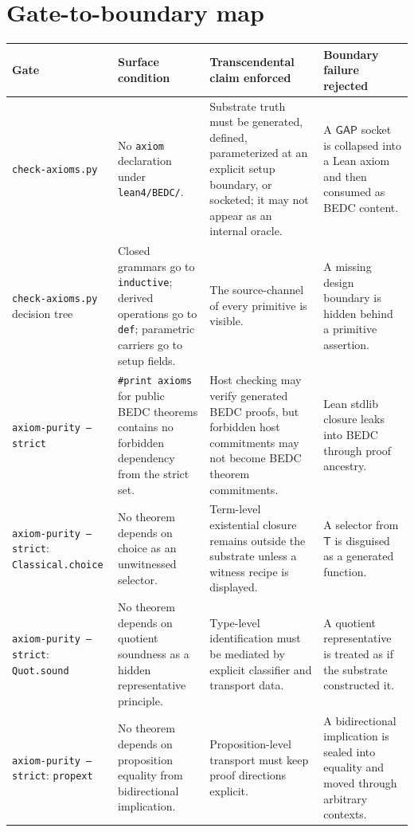 \section{Gate-to-boundary map}
\label{sec:audit-gates-long-map}

\begin{longtable}{p{}p{}p{}p{}}
\toprule
\textbf{Gate} & \textbf{Surface condition} & \textbf{Transcendental claim enforced} & \textbf{Boundary failure rejected} \\
\midrule
\texttt{check-axioms.py} & No \texttt{axiom} declaration under \texttt{lean4/BEDC/}. & Substrate truth must be generated, defined, parameterized at an explicit setup boundary, or socketed; it may not appear as an internal oracle. & A $\mathsf{GAP}$ socket is collapsed into a Lean axiom and then consumed as BEDC content. \\
\texttt{check-axioms.py} decision tree & Closed grammars go to \texttt{inductive}; derived operations go to \texttt{def}; parametric carriers go to setup fields. & The source-channel of every primitive is visible. & A missing design boundary is hidden behind a primitive assertion. \\
\texttt{axiom-purity --strict} & \texttt{\#print axioms} for public BEDC theorems contains no forbidden dependency from the strict set. & Host checking may verify generated BEDC proofs, but forbidden host commitments may not become BEDC theorem commitments. & Lean stdlib closure leaks into BEDC through proof ancestry. \\
\texttt{axiom-purity --strict}: \texttt{Classical.choice} & No theorem depends on choice as an unwitnessed selector. & Term-level existential closure remains outside the substrate unless a witness recipe is displayed. & A selector from $\mathsf{T}$ is disguised as a generated function. \\
\texttt{axiom-purity --strict}: \texttt{Quot.sound} & No theorem depends on quotient soundness as a hidden representative principle. & Type-level identification must be mediated by explicit classifier and transport data. & A quotient representative is treated as if the substrate constructed it. \\
\texttt{axiom-purity --strict}: \texttt{propext} & No theorem depends on proposition equality from bidirectional implication. & Proposition-level transport must keep proof directions explicit. & A bidirectional implication is sealed into equality and moved through arbitrary contexts. \\

\end{longtable}
